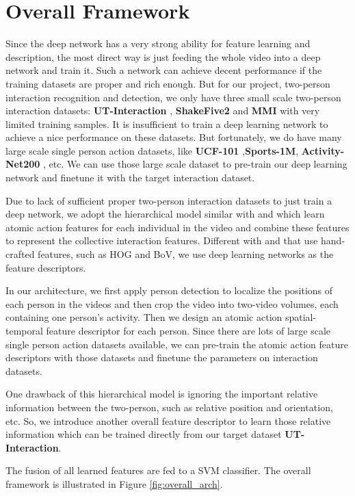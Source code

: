 \section{Overall Framework}
\label{3_1}
Since the deep network has a very strong ability for feature learning and description, the most direct way is just feeding the whole video into a deep network and train it. Such a network can achieve decent performance if the training datasets are proper and rich enough. But for our project, two-person interaction recognition and detection, we only have three small scale two-person interaction datasets: \textbf{UT-Interaction} \cite{ut2010}, \textbf{ShakeFive2} \cite{shakefive2} and \textbf{MMI} \cite{m2i_tju}  with very limited training samples. It is insufficient to train a deep learning network to achieve a nice performance on these datasets.  But fortunately, we do have many large scale single person action datasets, like \textbf{UCF-101} \cite{ucf101},\textbf{Sports-1M}, \textbf{Activity-Net200} \cite{activitynet200}, etc. We can use those large scale dataset to pre-train our deep learning network and finetune it with the target interaction dataset.
\par 
Due to lack of sufficient proper two-person interaction datasets to just train a deep network, we adopt the hierarchical model similar with \cite{choi2012} and  \cite{patron2010} which learn atomic action features for each individual in the video and combine these features to represent the collective interaction features. Different with \cite{choi2012} and \cite{patron2010} that use hand-crafted features, such as HOG and BoV, we use deep learning networks as the feature descriptors.
\par    
In our architecture, we first apply person detection to localize the positions of each person in the videos and then crop the video into  two-video volumes, each containing one person's activity. Then we design an atomic action spatial-temporal feature descriptor for each person. Since there are lots of large scale single person action datasets available, we can pre-train the atomic action feature descriptors with those datasets and finetune the parameters on interaction datasets.
\par 
One drawback of this hierarchical model is ignoring the important relative information between the two-person, such as relative position and orientation, etc. So, we introduce another overall feature descriptor to learn those relative information which can be trained directly from our target dataset \textbf{UT-Interaction}. 
\par 
 The fusion of all learned features are fed to a SVM classifier. The overall framework is illustrated in Figure \ref{fig:overall_arch}.
 
